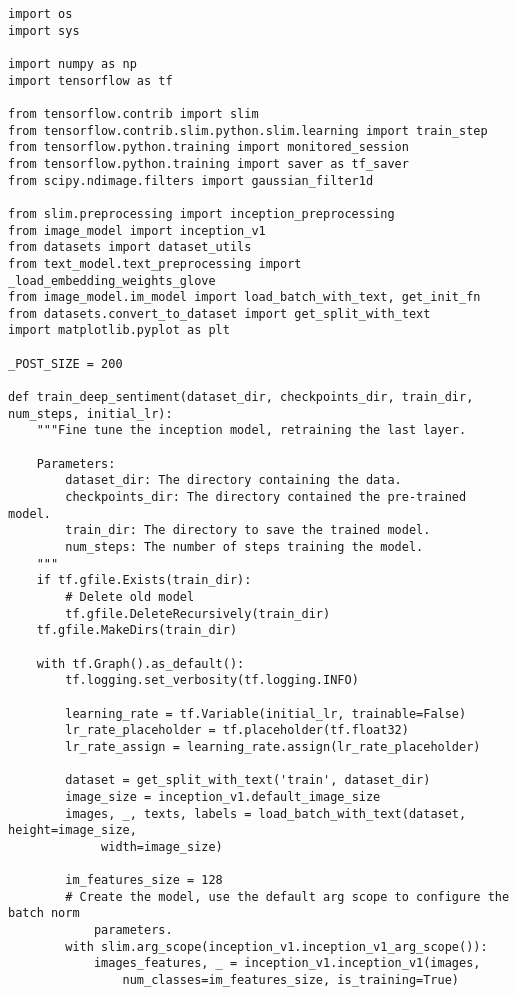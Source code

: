 \begin{lstlisting}
import os
import sys

import numpy as np
import tensorflow as tf

from tensorflow.contrib import slim
from tensorflow.contrib.slim.python.slim.learning import train_step
from tensorflow.python.training import monitored_session
from tensorflow.python.training import saver as tf_saver
from scipy.ndimage.filters import gaussian_filter1d

from slim.preprocessing import inception_preprocessing
from image_model import inception_v1
from datasets import dataset_utils
from text_model.text_preprocessing import _load_embedding_weights_glove
from image_model.im_model import load_batch_with_text, get_init_fn
from datasets.convert_to_dataset import get_split_with_text
import matplotlib.pyplot as plt

_POST_SIZE = 200

def train_deep_sentiment(dataset_dir, checkpoints_dir, train_dir, num_steps, initial_lr):
    """Fine tune the inception model, retraining the last layer.

    Parameters:
        dataset_dir: The directory containing the data.
        checkpoints_dir: The directory contained the pre-trained model.
        train_dir: The directory to save the trained model.
        num_steps: The number of steps training the model.
    """
    if tf.gfile.Exists(train_dir):
        # Delete old model
        tf.gfile.DeleteRecursively(train_dir)
    tf.gfile.MakeDirs(train_dir)

    with tf.Graph().as_default():
        tf.logging.set_verbosity(tf.logging.INFO)

        learning_rate = tf.Variable(initial_lr, trainable=False)
        lr_rate_placeholder = tf.placeholder(tf.float32)
        lr_rate_assign = learning_rate.assign(lr_rate_placeholder)

        dataset = get_split_with_text('train', dataset_dir)
        image_size = inception_v1.default_image_size
        images, _, texts, labels = load_batch_with_text(dataset, height=image_size, 
             width=image_size)
        
        im_features_size = 128
        # Create the model, use the default arg scope to configure the batch norm 
            parameters.
        with slim.arg_scope(inception_v1.inception_v1_arg_scope()):
            images_features, _ = inception_v1.inception_v1(images, 
                num_classes=im_features_size, is_training=True)


\end{lstlisting}
